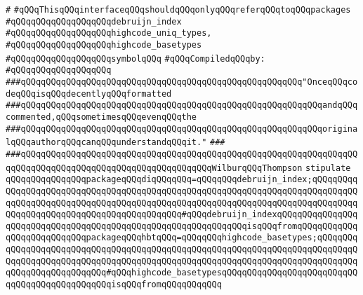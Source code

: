 \verb|#|\newline
\verb|#qQQqThisqQQqinterfaceqQQqshouldqQQqonlyqQQqreferqQQqtoqQQqpackages|\newline
\verb|#qQQqqQQqqQQqqQQqqQQqdebruijn_index|\newline
\verb|#qQQqqQQqqQQqqQQqqQQqhighcode_uniq_types,|\newline
\verb|#qQQqqQQqqQQqqQQqqQQqhighcode_basetypes|\newline
\verb|#qQQqqQQqqQQqqQQqqQQqsymbolqQQq|\newline
\newline
\verb|#qQQqCompiledqQQqby:|\newline
\verb|#qQQqqQQqqQQqqQQqqQQq|\newline
\newline
\newline
\newline
\verb|###qQQqqQQqqQQqqQQqqQQqqQQqqQQqqQQqqQQqqQQqqQQqqQQqqQQqqQQq"OnceqQQqcodeqQQqisqQQqdecentlyqQQqformatted|\newline
\verb|###qQQqqQQqqQQqqQQqqQQqqQQqqQQqqQQqqQQqqQQqqQQqqQQqqQQqqQQqqQQqandqQQqcommented,qQQqsometimesqQQqevenqQQqthe|\newline
\verb|###qQQqqQQqqQQqqQQqqQQqqQQqqQQqqQQqqQQqqQQqqQQqqQQqqQQqqQQqqQQqoriginalqQQqauthorqQQqcanqQQqunderstandqQQqit."|\newline
\verb|###|\newline
\verb|###qQQqqQQqqQQqqQQqqQQqqQQqqQQqqQQqqQQqqQQqqQQqqQQqqQQqqQQqqQQqqQQqqQQqqQQqqQQqqQQqqQQqqQQqqQQqqQQqqQQqqQQqqQQqWilburqQQqThompson|\newline
\newline
\newline
\verb|stipulate|\newline
\verb|qQQqqQQqqQQqqQQqpackageqQQqdiqQQqqQQq=qQQqqQQqdebruijn_index;qQQqqQQqqQQqqQQqqQQqqQQqqQQqqQQqqQQqqQQqqQQqqQQqqQQqqQQqqQQqqQQqqQQqqQQqqQQqqQQqqQQqqQQqqQQqqQQqqQQqqQQqqQQqqQQqqQQqqQQqqQQqqQQqqQQqqQQqqQQqqQQqqQQqqQQqqQQqqQQqqQQqqQQqqQQqqQQqqQQqqQQq#qQQqdebruijn_indexqQQqqQQqqQQqqQQqqQQqqQQqqQQqqQQqqQQqqQQqqQQqqQQqqQQqqQQqqQQqqQQqisqQQqfromqQQqqQQqqQQq|\newline
\verb|qQQqqQQqqQQqqQQqpackageqQQqhbtqQQq=qQQqqQQqhighcode_basetypes;qQQqqQQqqQQqqQQqqQQqqQQqqQQqqQQqqQQqqQQqqQQqqQQqqQQqqQQqqQQqqQQqqQQqqQQqqQQqqQQqqQQqqQQqqQQqqQQqqQQqqQQqqQQqqQQqqQQqqQQqqQQqqQQqqQQqqQQqqQQqqQQqqQQqqQQqqQQqqQQqqQQqqQQq#qQQqhighcode_basetypesqQQqqQQqqQQqqQQqqQQqqQQqqQQqqQQqqQQqqQQqqQQqqQQqisqQQqfromqQQqqQQqqQQq|\newline
